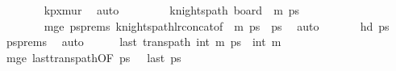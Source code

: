 \begin{isabellebody}
\ \ \ \ \ \ \isamarkupfalse%
\ kp{\isacharunderscore}{\kern0pt}{}xm{\isacharunderscore}{\kern0pt}ur\ \isamarkupfalse%
\ auto\isanewline
\ \ \ \ \isamarkupfalse%
\ \isamarkupfalse%
\ {}{\isacharcolon}{\kern0pt}\ {\isachardoublequoteopen}knights{\isacharunderscore}{\kern0pt}path\ {\isacharparenleft}{\kern0pt}board\ {}\ m{\isacharparenright}{\kern0pt}\ {\isacharquery}{\kern0pt}ps{\isacharprime}{\kern0pt}{\isachardoublequoteclose}\ \ \ \ \ \ \ \ \ \ \ \ \ \ \isanewline
\ \ \ \ \ \ \isamarkupfalse%
\ m{\isacharunderscore}{\kern0pt}ge\ ps{\isacharunderscore}{\kern0pt}prems\ knights{\isacharunderscore}{\kern0pt}path{\isacharunderscore}{\kern0pt}lr{\isacharunderscore}{\kern0pt}concat{\isacharbrackleft}{\kern0pt}of\ {}\ {\isachardoublequoteopen}m{\isacharminus}{\kern0pt}{}{\isachardoublequoteclose}\ ps\ {}\ {\isacharquery}{\kern0pt}ps\ \isamarkupfalse%
\ auto\isanewline
\isanewline
\ \ \ \ \isamarkupfalse%
\ {}{\isacharcolon}{\kern0pt}\ {\isachardoublequoteopen}hd\ {\isacharquery}{\kern0pt}ps{\isacharprime}{\kern0pt}\ {\isacharequal}{\kern0pt}\ {\isacharparenleft}{\kern0pt}{}{\isacharcomma}{\kern0pt}{}{\isacharparenright}{\kern0pt}{\isachardoublequoteclose}\ \isamarkupfalse%
\ ps{\isacharunderscore}{\kern0pt}prems\ \isamarkupfalse%
\ auto\isanewline
\isanewline
\ \ \ \ \isamarkupfalse%
\ {\isachardoublequoteopen}last\ {\isacharparenleft}{\kern0pt}trans{\isacharunderscore}{\kern0pt}path\ {\isacharparenleft}{\kern0pt}{}{\isacharcomma}{\kern0pt}int\ {\isacharparenleft}{\kern0pt}m{\isacharminus}{\kern0pt}{}{\isacharparenright}{\kern0pt}{\isacharparenright}{\kern0pt}\ {\isacharquery}{\kern0pt}ps\ {\isacharequal}{\kern0pt}\ {\isacharparenleft}{\kern0pt}{}{\isacharcomma}{\kern0pt}int\ m{\isacharminus}{\kern0pt}{}{\isacharparenright}{\kern0pt}{\isachardoublequoteclose}\isanewline
\ \ \ \ \ \ \isamarkupfalse%
\ m{\isacharunderscore}{\kern0pt}ge\ last{\isacharunderscore}{\kern0pt}trans{\isacharunderscore}{\kern0pt}path{\isacharbrackleft}{\kern0pt}OF\ {\isacartoucheopen}{\isacharquery}{\kern0pt}ps\ {\isasymnoteq}\ {\isacharbrackleft}{\kern0pt}{\isacharbrackright}{\kern0pt}{\isacartoucheclose}\ {\isacartoucheopen}last\ {\isacharquery}{\kern0pt}ps\ {\isacharequal}{\kern0pt}\ {\isacharparenleft}{\kern0pt}{}{\isacharcomma}{\kern0pt}{}{\isacharparenright}{\kern0pt}{\isacartoucheclose}{\isacharbrackright}{\kern0pt}\ \isamarkupfalse%

\end{isabellebody}
